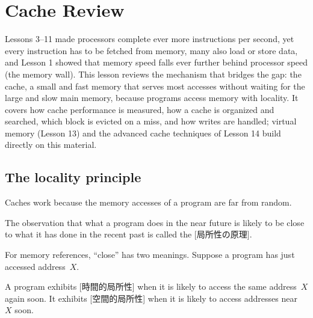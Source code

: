 \documentclass[../main.tex]{subfiles}
\begin{document}
\chapter{Cache Review}

Lessons 3--11 made processors complete ever more instructions per second,
yet every instruction has to be fetched from memory, many also load or
store data, and Lesson 1 showed that memory speed falls ever further behind
processor speed (the memory wall).  This lesson reviews the mechanism that
bridges the gap: the cache, a small and fast memory that serves most accesses
without waiting for the large and slow main memory, because programs access
memory with locality.  It covers how cache performance is measured, how a
cache is organized and searched, which block is evicted on a miss, and how
writes are handled; virtual memory (Lesson 13) and the advanced cache
techniques of Lesson 14 build directly on this material.

\section{The locality principle}
\label{sec:l12-locality}

Caches work because the memory accesses of a program are far from
random.

\begin{definition}
  The observation that what a program does in the near future is likely to be
  close to what it has done in the recent past is called the
  [局所性の原理].
\end{definition}

For memory references, \enquote{close} has two meanings.  Suppose a program
has just accessed address~$X$.

\begin{definition}
  A program exhibits [時間的局所性] when it is likely
  to access the same address~$X$ again soon.  It exhibits
  [空間的局所性] when it is likely to access addresses
  near~$X$ soon.
\end{definition}
\end{document}
